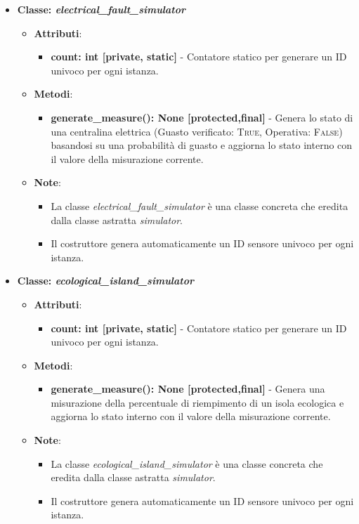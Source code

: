 \begin{itemize}
    \item{\textbf{Classe: \textit{electrical\_fault\_simulator}}}
    \begin{itemize}
        \item \textbf{Attributi}: 
        \begin{itemize}
            \item \textbf{count: int [private, static]} - Contatore statico per generare un ID univoco per ogni istanza.
        \end{itemize}
        \item \textbf{Metodi}: 
        \begin{itemize}
            \item \textbf{generate\_measure(): None [protected,final]} - Genera lo stato di una centralina elettrica (Guasto verificato: \textsc{True}, Operativa: \textsc{False}) basandosi su una probabilità di guasto e aggiorna lo stato interno con il valore della misurazione corrente.
        \end{itemize}
        \item \textbf{Note}:
        \begin{itemize}
            \item La classe \textit{electrical\_fault\_simulator} è una classe concreta che eredita dalla classe astratta \textit{simulator}.
            \item Il costruttore genera automaticamente un ID sensore univoco per ogni istanza.
        \end{itemize}
    \end{itemize}

    \item{\textbf{Classe: \textit{ecological\_island\_simulator}}}
    \begin{itemize}
        \item \textbf{Attributi}: 
        \begin{itemize}
            \item \textbf{count: int [private, static]} - Contatore statico per generare un ID univoco per ogni istanza.
        \end{itemize}
        \item \textbf{Metodi}: 
        \begin{itemize}
            \item \textbf{generate\_measure(): None [protected,final]} - Genera una misurazione della percentuale di riempimento di un isola ecologica e aggiorna lo stato interno con il valore della misurazione corrente.
        \end{itemize}
        \item \textbf{Note}:
        \begin{itemize}
            \item La classe \textit{ecological\_island\_simulator} è una classe concreta che eredita dalla classe astratta \textit{simulator}.
            \item Il costruttore genera automaticamente un ID sensore univoco per ogni istanza.
        \end{itemize}
    \end{itemize}


\end{itemize}
